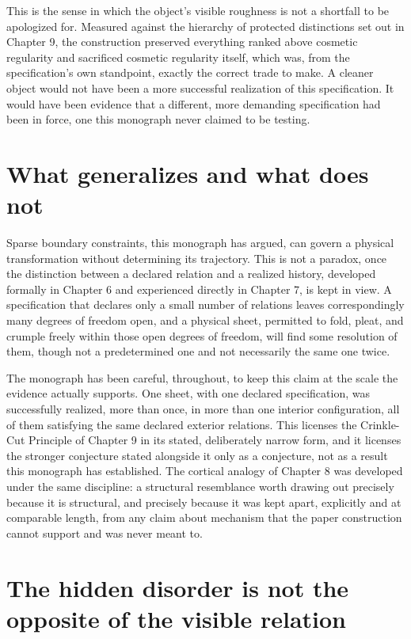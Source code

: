 \documentclass[11pt,oneside]{book}
\begin{document}
This is the sense in which the object's visible roughness is not a
shortfall to be apologized for. Measured against the hierarchy of
protected distinctions set out in Chapter 9, the construction preserved
everything ranked above cosmetic regularity and sacrificed cosmetic
regularity itself, which was, from the specification's own standpoint,
exactly the correct trade to make. A cleaner object would not have been
a more successful realization of this specification. It would have been
evidence that a different, more demanding specification had been in
force, one this monograph never claimed to be testing.

\hypertarget{what-generalizes-and-what-does-not}{%
\section{What generalizes and what does
not}\label{what-generalizes-and-what-does-not}}

Sparse boundary constraints, this monograph has argued, can govern a
physical transformation without determining its trajectory. This is not
a paradox, once the distinction between a declared relation and a
realized history, developed formally in Chapter 6 and experienced
directly in Chapter 7, is kept in view. A specification that declares
only a small number of relations leaves correspondingly many degrees of
freedom open, and a physical sheet, permitted to fold, pleat, and
crumple freely within those open degrees of freedom, will find some
resolution of them, though not a predetermined one and not necessarily
the same one twice.

The monograph has been careful, throughout, to keep this claim at the
scale the evidence actually supports. One sheet, with one declared
specification, was successfully realized, more than once, in more than
one interior configuration, all of them satisfying the same declared
exterior relations. This licenses the Crinkle-Cut Principle of Chapter 9
in its stated, deliberately narrow form, and it licenses the stronger
conjecture stated alongside it only as a conjecture, not as a result
this monograph has established. The cortical analogy of Chapter 8 was
developed under the same discipline: a structural resemblance worth
drawing out precisely because it is structural, and precisely because it
was kept apart, explicitly and at comparable length, from any claim
about mechanism that the paper construction cannot support and was never
meant to.

\hypertarget{the-hidden-disorder-is-not-the-opposite-of-the-visible-relation}{%
\section{The hidden disorder is not the opposite of the visible
relation}\label{the-hidden-disorder-is-not-the-opposite-of-the-visible-relation}}
\end{document}
